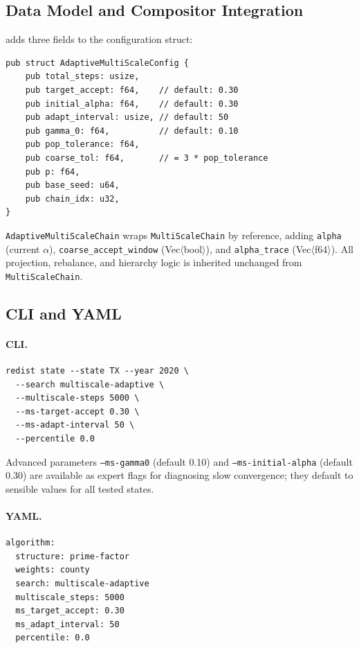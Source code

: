 \subsection{Data Model and Compositor Integration}

\ams{} adds three fields to the \ms{} configuration struct:

\begin{verbatim}
pub struct AdaptiveMultiScaleConfig {
    pub total_steps: usize,
    pub target_accept: f64,    // default: 0.30
    pub initial_alpha: f64,    // default: 0.30
    pub adapt_interval: usize, // default: 50
    pub gamma_0: f64,          // default: 0.10
    pub pop_tolerance: f64,
    pub coarse_tol: f64,       // = 3 * pop_tolerance
    pub p: f64,
    pub base_seed: u64,
    pub chain_idx: u32,
}
\end{verbatim}

\noindent
\texttt{AdaptiveMultiScaleChain} wraps \texttt{MultiScaleChain} by reference,
adding \texttt{alpha} (current $\alpha$), \texttt{coarse\_accept\_window}
(Vec$\langle$bool$\rangle$), and \texttt{alpha\_trace} (Vec$\langle$f64$\rangle$).
All projection, rebalance, and hierarchy logic is inherited unchanged from
\texttt{MultiScaleChain}.

\subsection{CLI and YAML}

\paragraph{CLI.}
\begin{verbatim}
redist state --state TX --year 2020 \
  --search multiscale-adaptive \
  --multiscale-steps 5000 \
  --ms-target-accept 0.30 \
  --ms-adapt-interval 50 \
  --percentile 0.0
\end{verbatim}

Advanced parameters \texttt{--ms-gamma0} (default 0.10) and
\texttt{--ms-initial-alpha} (default 0.30) are available as expert flags for
diagnosing slow convergence; they default to sensible values for all tested
states.

\paragraph{YAML.}
\begin{verbatim}
algorithm:
  structure: prime-factor
  weights: county
  search: multiscale-adaptive
  multiscale_steps: 5000
  ms_target_accept: 0.30
  ms_adapt_interval: 50
  percentile: 0.0
\end{verbatim}


